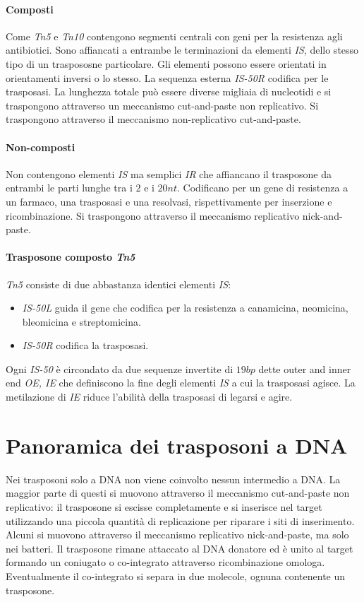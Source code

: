 			\paragraph{Composti}
			Come \emph{Tn5} e \emph{Tn10} contengono segmenti centrali con geni per la resistenza agli antibiotici.
			Sono affiancati a entrambe le terminazioni da elementi \emph{IS}, dello stesso tipo di un traspososne particolare.
			Gli elementi possono essere orientati in orientamenti inversi o lo stesso.
			La sequenza esterna \emph{IS-50R} codifica per le trasposasi.
			La lunghezza totale pu\`o essere diverse migliaia di nucleotidi e si traspongono attraverso un meccanismo cut-and-paste non replicativo.
			Si traspongono attraverso il meccanismo non-replicativo cut-and-paste.

			\paragraph{Non-composti}
			Non contengono elementi \emph{IS} ma semplici \emph{IR} che affiancano il trasposone da entrambi le parti lunghe tra i $2$ e i $20nt$.
			Codificano per un gene di resistenza a un farmaco, una trasposasi e una resolvasi, rispettivamente per inserzione e ricombinazione.
			Si traspongono attraverso il meccanismo replicativo nick-and-paste.

			\paragraph{Trasposone composto \emph{Tn5}}
			\emph{Tn5} consiste di due abbastanza identici elementi \emph{IS}:
			\begin{itemize}
				\item \emph{IS-50L} guida il gene che codifica per la resistenza a canamicina, neomicina, bleomicina e streptomicina.
				\item \emph{IS-50R} codifica la trasposasi.
			\end{itemize}
			Ogni \emph{IS-50} \`e circondato da due sequenze invertite di $19bp$ dette outer and inner end \emph{OE, IE} che definiscono la fine degli elementi \emph{IS} a cui la trasposasi agisce.
			La metilazione di \emph{IE} riduce l'abilit\`a della trasposasi di legarsi e agire.

\section{Panoramica dei trasposoni a DNA}
Nei trasposoni solo a DNA non viene coinvolto nessun intermedio a DNA.
La maggior parte di questi si muovono attraverso il meccanismo cut-and-paste non replicativo: il trasposone si escisse completamente e si inserisce nel target utilizzando una piccola quantit\`a di replicazione per riparare i siti di inserimento.
Alcuni si muovono attraverso il meccanismo replicativo nick-and-paste, ma solo nei batteri.
Il trasposone rimane attaccato al DNA donatore ed \`e unito al target formando un coniugato o co-integrato attraverso ricombinazione omologa.
Eventualmente il co-integrato si separa in due molecole, ognuna contenente un trasposone.

